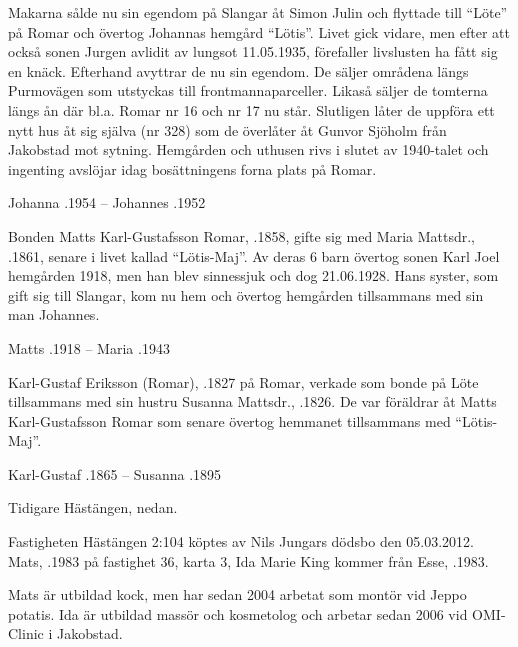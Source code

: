 
Makarna sålde nu sin egendom på Slangar åt Simon Julin och flyttade till ``Löte'' på Romar och övertog Johannas hemgård  ``Lötis''. Livet gick vidare, men efter att också sonen Jurgen avlidit av lungsot 11.05.1935, förefaller livslusten ha fått sig en knäck. Efterhand avyttrar de nu sin egendom. De säljer områdena  längs Purmovägen som utstyckas till frontmannaparceller. Likaså säljer de tomterna längs ån där bl.a.  Romar nr 16 och nr 17 nu står. Slutligen låter de uppföra ett nytt hus åt sig själva (nr 328) som de överlåter åt Gunvor Sjöholm från Jakobstad mot sytning. Hemgården och uthusen rivs i slutet av 1940-talet och ingenting avslöjar idag bosättningens forna plats på Romar.

Johanna .1954  --  Johannes .1952


Bonden Matts Karl-Gustafsson Romar, .1858, gifte sig med Maria Mattsdr., .1861, senare i livet kallad ``Lötis-Maj''. Av deras 6 barn övertog sonen Karl Joel hemgården 1918, men han blev sinnessjuk och dog 21.06.1928. Hans syster, som gift sig till Slangar, kom nu hem och övertog hemgården tillsammans med sin man Johannes.

Matts .1918  --  Maria .1943


Karl-Gustaf Eriksson (Romar), .1827 på Romar, verkade som bonde på Löte tillsammans med sin hustru Susanna Mattsdr., .1826. De var föräldrar åt Matts Karl-Gustafsson Romar som senare övertog hemmanet tillsammans med ``Lötis-Maj''.

Karl-Gustaf .1865  --  Susanna .1895



Tidigare Hästängen, nedan.



Fastigheten Hästängen 2:104 köptes av Nils Jungars dödsbo den 05.03.2012. Mats, .1983 på fastighet 36, karta 3, Ida Marie King kommer från Esse, .1983.

Mats är utbildad kock, men har sedan 2004 arbetat som montör vid Jeppo potatis. Ida är utbildad massör och kosmetolog och arbetar sedan 2006 vid OMI-Clinic i Jakobstad.
\begin{jhchildren}
  \item {}
  \item {}
  \item {}
\end{jhchildren}

